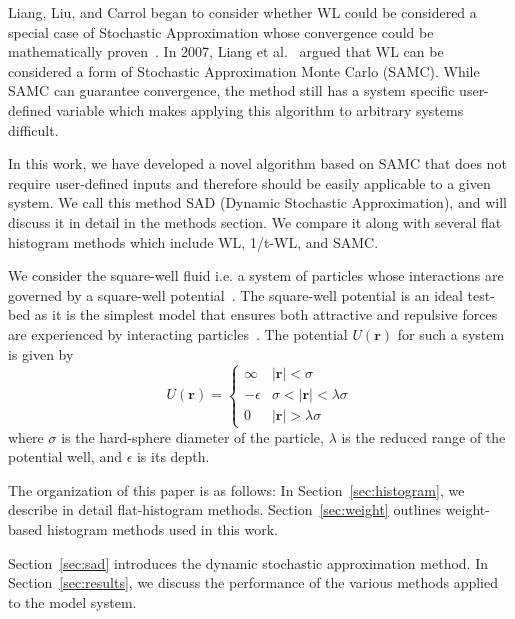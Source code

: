 \documentclass[letterpaper,twocolumn,amsmath,amssymb,pre,aps,10pt]{revtex4-1}
\begin{document}
Liang, Liu, and Carrol began to consider whether WL could be considered
a special case of Stochastic Approximation whose convergence could be
mathematically proven~\cite{liang2006theory, liang2007stochastic}. In
2007, Liang et al.~\cite{liang2007stochastic} argued that WL can be
considered a form of Stochastic Approximation Monte Carlo (SAMC). While
SAMC can guarantee convergence, the method still has a system specific
user-defined variable which makes applying this algorithm to arbitrary
systems difficult.

In this work, we have developed a novel algorithm based on SAMC that
does not require user-defined inputs and therefore should be easily
applicable to a given system.  We call this method SAD (Dynamic
Stochastic Approximation), and will discuss it in detail in the methods
section. We compare it along with several flat histogram methods
which include WL, 1/t-WL, and SAMC.

We consider the square-well fluid i.e. a system of particles whose
interactions are governed by a square-well
potential~\cite{singh2003surface, barker2004perturbationSW}.  The
square-well potential is an ideal test-bed as it is the simplest model
that ensures both attractive and repulsive forces are experienced by
interacting particles~\cite{barker1967-SW-perturbation, vega1992phase}.
The potential $U(\textbf{r})$ for such a system is given by
\begin{equation}
 U(\textbf{r})=\begin{cases} \infty &
 \lvert\textbf{r}\rvert< \sigma\\-\epsilon &
 \sigma<\lvert\textbf{r}\rvert<\lambda\sigma\\0 &
 \lvert\textbf{r}\rvert > \lambda\sigma\end{cases}
\end{equation}
where $\sigma$ is the hard-sphere diameter of the particle, $\lambda$ is the
reduced range of the potential well, and $\epsilon$ is its depth.

The organization of this paper is as follows: In Section~\ref{sec:histogram}, we
describe in detail flat-histogram methods.  Section~\ref{sec:weight} outlines
weight-based histogram methods used in this work.

Section~\ref{sec:sad} introduces the dynamic stochastic approximation method.
In Section~\ref{sec:results}, we discuss the performance of the various methods
applied to the model system.
\end{document}
